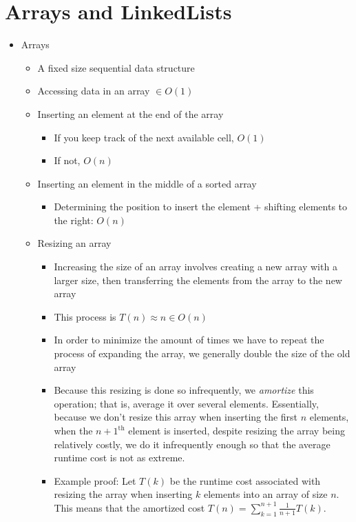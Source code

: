 \documentclass{article}
\begin{document}
\section{Arrays and LinkedLists}
\begin{itemize}
    \item Arrays
        \begin{itemize}
            \item A fixed size sequential data structure
            \item Accessing data in an array $\in O(1)$
            \item Inserting an element at the end of the array
                \begin{itemize}
                    \item If you keep track of the next available cell, $O(1)$
                    \item If not, $O(n)$
                \end{itemize}
            \item Inserting an element in the middle of a sorted array
                \begin{itemize}
                    \item Determining the position to insert the element + shifting elements to the right: $O(n)$
                \end{itemize}
            \item Resizing an array
                \begin{itemize}
                    \item Increasing the size of an array involves creating a new array with a larger size, then transferring the elements from the array to the new array
                    \item This process is $T(n) \approx n \in O(n)$
                    \item In order to minimize the amount of times we have to repeat the process of expanding the array, we generally double the size of the old array
                    \item Because this resizing is done so infrequently, we \textit{amortize} this operation; that is, average it over several elements. Essentially, because we don't resize this array when inserting the first $n$ elements, when the $n + 1^{\mathrm{th}}$ element is inserted, despite resizing the array being relatively costly, we do it infrequently enough so that the average runtime cost is not as extreme.
                    \item Example proof: Let $T(k)$ be the runtime cost associated with resizing the array when inserting $k$ elements into an array of size $n$. This means that the amortized cost $T(n) = \sum_{k = 1}^{n + 1} \frac{1}{n + 1}T(k)$. \\


\end{itemize}
\end{itemize}
\end{itemize}
\end{document}
